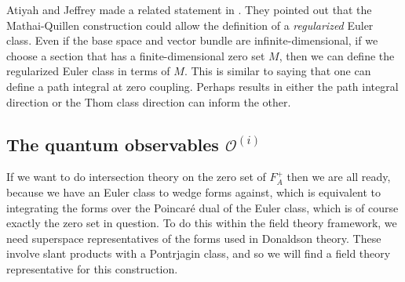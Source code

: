 \documentclass[twoside]{amsart}
\newcommand{\mytexorpdfstring}[2]{\texorpdfstring{#1}{#2}}
\newcommand{\enm}[1]{\ensuremath{#1}}
\newcommand{\oi}[1]{\enm{\mathcal{O}^{(#1)}}}
\begin{document}
Atiyah and Jeffrey made a related statement in \cite{atiyahjeffrey}.
They pointed out that the Mathai-Quillen construction could allow the
definition of a \emph{regularized} Euler class.  Even if the base
space and vector bundle are infinite-dimensional, if we choose a
section that has a finite-dimensional zero set \( M \), then we can
define the regularized Euler class in terms of \( M \).  This is
similar to saying that one can define a path integral at zero
coupling.  Perhaps results in either the path integral direction or
the Thom class direction can inform the other.

\subsection{The quantum observables \mytexorpdfstring{\oi{i}}{O(i)}}

If we want to do intersection theory on the zero set of \( F_{A}^{+}
\) then we are all ready, because we have an Euler class to wedge
forms
against, which is equivalent to integrating the forms over the
Poincar\'e dual of the Euler class, which is of course exactly the
zero set in question.  To do this within the field theory framework,
we need superspace representatives of the forms used in Donaldson
theory.  These involve slant products with a Pontrjagin class, and so
we will find a field theory representative for this construction.
\end{document}

